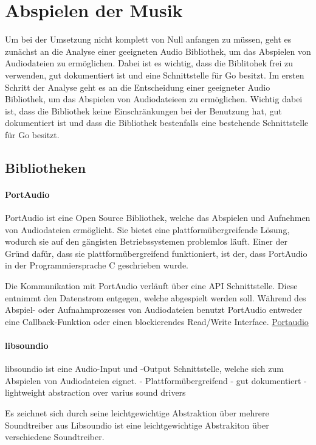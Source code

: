 \section{Abspielen der Musik}
Um bei der Umsetzung nicht komplett von Null anfangen zu müssen, geht es
zunächst an die Analyse einer geeigneten Audio Bibliothek, um das Abspielen von
Audiodateien zu ermöglichen. Dabei ist es wichtig, dass die Biblitohek frei zu
verwenden, gut dokumentiert ist und eine Schnittstelle für Go besitzt.  Im
ersten Schritt der Analyse geht es an die Entscheidung einer geeigneter Audio
Bibliothek, um das Abspielen von Audiodateieen zu ermöglichen. Wichtig dabei
ist, dass die Bibliothek keine Einschränkungen bei der Benutzung hat, gut
dokumentiert ist und dass die Bibliothek bestenfalls eine bestehende
Schnittstelle für Go besitzt.
\subsection{Bibliotheken}
\paragraph{PortAudio}
PortAudio ist eine Open Source Bibliothek, welche das Abspielen und Aufnehmen
von Audiodateien ermöglicht. Sie bietet eine plattformübergreifende Lösung,
wodurch sie auf den gängisten Betriebssystemen problemlos läuft. Einer der
Gründ dafür, dass sie plattformübergreifend funktioniert, ist der, dass
PortAudio in der Programmiersprache C geschrieben wurde. \hfill \break

Die Kommunikation mit PortAudio verläuft über eine \ac{API} Schnittstelle.
Diese entnimmt den Datenstrom entgegen, welche abgespielt werden soll. Während
des Abspiel- oder Aufnahmprozesses von Audiodateien benutzt PortAudio entweder
eine Callback-Funktion oder einen blockierendes Read/Write Interface.
\href{http://www.portaudio.com/}{Portaudio}

\paragraph{libsoundio}
libsoundio ist eine Audio-Input und -Output Schnittstelle, welche sich zum Abspielen
von Audiodateien eignet. 
- Plattformübergreifend
- gut dokumentiert
- lightweight abstraction over varius sound drivers


Es zeichnet sich durch seine leichtgewichtige
Abstraktion über mehrere Soundtreiber aus
Libsoundio ist eine leichtgewichtige Abstrakiton über verschiedene Soundtreiber. 

